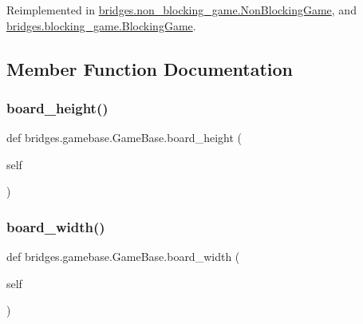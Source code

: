 Reimplemented in \mbox{\hyperlink{classbridges_1_1non__blocking__game_1_1_non_blocking_game_a19362773d256eec033f04cfd00b7160c}{bridges.\+non\+\_\+blocking\+\_\+game.\+Non\+Blocking\+Game}}, and \mbox{\hyperlink{classbridges_1_1blocking__game_1_1_blocking_game_ae2575c068499e269e2279695d5f598b4}{bridges.\+blocking\+\_\+game.\+Blocking\+Game}}.



\subsection{Member Function Documentation}
\mbox{\label{classbridges_1_1gamebase_1_1_game_base_ad1595582d3b02aa4225efed3beab935f}} 
\subsubsection{\texorpdfstring{board\_height()}{board\_height()}}
{\footnotesize\ttfamily def bridges.\+gamebase.\+Game\+Base.\+board\+\_\+height (\begin{DoxyParamCaption}\item[{}]{self }\end{DoxyParamCaption})}

\mbox{\label{classbridges_1_1gamebase_1_1_game_base_a46a635c075e1a0a651e4caa18369494d}} 
\subsubsection{\texorpdfstring{board\_width()}{board\_width()}}
{\footnotesize\ttfamily def bridges.\+gamebase.\+Game\+Base.\+board\+\_\+width (\begin{DoxyParamCaption}\item[{}]{self }\end{DoxyParamCaption})}

\mbox{\label{classbridges_1_1gamebase_1_1_game_base_aaeba94a7c5a58a305284976b015ed17e}} 
